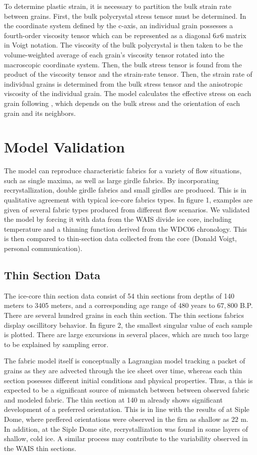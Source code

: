\documentclass{article}
\begin{document}
To determine plastic strain, it is necessary to partition the bulk strain rate between grains. First, the bulk polycrystal stress tensor must be determined. In the coordinate system defined by the c-axis, an individual grain possesses a fourth-order viscosity tensor which can be represented as a diagonal $6x6$ matrix in Voigt notation. The viscosity of the bulk polycrystal is then taken to be the volume-weighted average of each grain's viscosity tensor rotated into the macroscopic coordinate system. Then, the bulk stress tensor is found from the product of the viscosity tensor and the strain-rate tensor. Then, the strain rate of individual grains is determined from the bulk stress tensor and the anisotropic viscosity of the individual grain. The model calculates the effective stress on each grain following \citet{azuma96}, which depends on the bulk stress and the orientation of each grain and its neighbors.  


\section{Model Validation}
The model can reproduce characteristic fabrics for a variety of flow situations, such as single maxima, as well as large girdle fabrics. By incorporating recrystallization, double girdle fabrics and small girdles are produced. This is in qualitative agreement with typical ice-core fabrics types. In figure 1, examples are given of several fabric types produced from different flow scenarios. We validated the model by forcing it with data from the WAIS divide ice core, including temperature and a thinning function derived from the WDC06 chronology. This is then compared to thin-section data collected from the core (Donald Voigt, personal communication).

\subsection{Thin Section Data}
The ice-core thin section data consist of 54 thin sections from depths of 140 meters to 3405 meters, and a corresponding age range of 480 years to $67,800$ B.P. There are several hundred grains in each thin section. The thin sections fabrics display oscillitory behavior. In figure 2, the smallest singular value of each sample is plotted. There are large excursions in several places, which are much too large to be explained by sampling error. 

The fabric model itself is conceptually a Lagrangian model tracking a packet of grains as they are advected through the ice sheet over time, whereas each thin section posesses different initial conditions and physical properties. Thus, a this is expected to be a significant source of mismatch between between observed fabric and modeled fabric. The thin section at 140 m already shows significant development of a preferred orientation. This is in line with the results of \citet{diprinzio2005} at Siple Dome, where preffered orientations were observed in the firn as shallow as 22 m. In addition, at the Siple Dome site, recrystallization was found in some layers of shallow, cold ice. A similar process may contribute to the variability observed in the WAIS thin sections.
\end{document}

